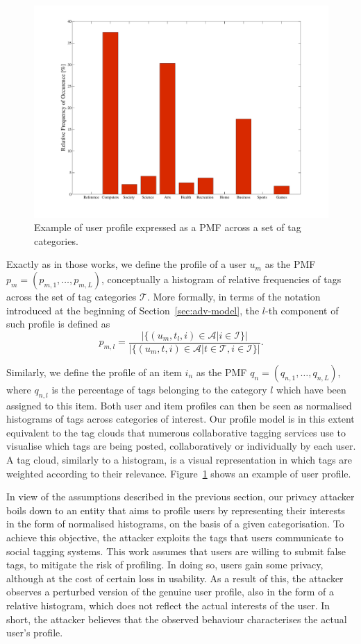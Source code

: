 \begin{figure}[htb]
\includegraphics[width=\textwidth]{figures/UPRel.pdf}
\caption[User PMF.]{Example of user profile expressed as a PMF across a set of tag categories.
\label{fig:UserProfile}}
\end{figure}

Exactly as in those works, we define the profile of a user $u_m$ as the PMF $p_m = (p_{m,1},\ldots, p_{m,L})$, conceptually a histogram of relative frequencies of tags across the set of tag categories $\mathcal{T}$. More formally, in terms of the notation introduced at the beginning of Section~\ref{sec:adv-model}, the $l$-th component of such profile is defined as
$$p_{m,l} = \frac{|\{(u_m,t_l,i)\in\mathcal{A} | i\in\mathcal{I}\}|}{|\{(u_m,t,i)\in\mathcal{A} | t\in\mathcal{T}, i\in\mathcal{I}\}|}.$$

Similarly, we define the profile of an item $i_n$ as the PMF $q_n =(q_{n,1},\ldots, q_{n,L})$, where $q_{n,l}$ is the percentage of tags belonging to the category $l$ which have been assigned to this item. Both user and item profiles can then be seen as normalised histograms of tags across categories of interest. Our profile model is in this extent equivalent to the tag clouds that numerous collaborative tagging services use to visualise which tags are being posted, collaboratively or individually by each user. A tag cloud, similarly to a histogram, is a visual representation in which tags are weighted according to their relevance. Figure~\ref{fig:UserProfile} shows an example of user profile.

In view of the assumptions described in the previous section, our privacy attacker boils down to an entity that aims to profile users by representing their interests in the form of normalised histograms, on the basis of a given categorisation.
To achieve this objective, the attacker exploits the tags that users communicate to social tagging systems. This work assumes that users are willing to submit false tags, to mitigate the risk of profiling. In doing so, users gain some privacy, although at the cost of certain loss in usability. As a result of this, the attacker observes a perturbed version of the genuine user profile, also in the form of a relative histogram, which does not reflect the actual interests of the user. In short, the attacker believes that the observed behaviour characterises the actual user's profile.

